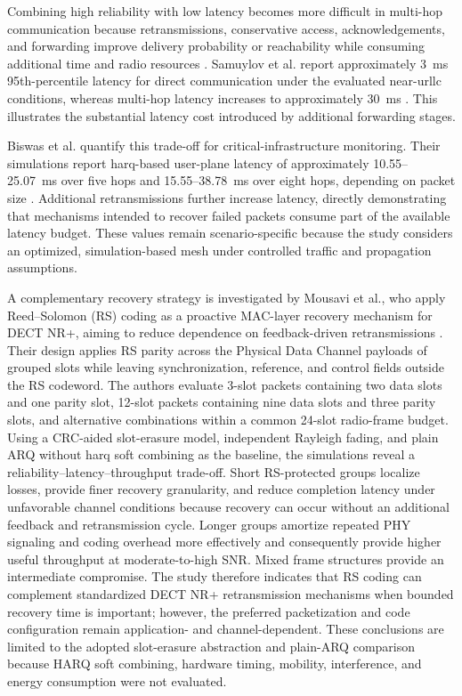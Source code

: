 Combining high reliability with low latency becomes more difficult in multi-hop communication because retransmissions, conservative access, acknowledgements, and forwarding improve delivery probability or reachability while consuming additional time and radio resources \cite{samuylovPerformanceMACLayer2024a, glazkovImprovingNearURLLCServices2025}. Samuylov et al. report approximately 3~ms 95th-percentile latency for direct communication under the evaluated near-\gls{urllc} conditions, whereas multi-hop latency increases to approximately 30~ms \cite{samuylovEmpoweringNearURLLCIoT2025}. This illustrates the substantial latency cost introduced by additional forwarding stages.

Biswas et al. quantify this trade-off for critical-infrastructure monitoring. Their simulations report \gls{harq}-based user-plane latency of approximately 10.55--25.07~ms over five hops and 15.55--38.78~ms over eight hops, depending on packet size \cite{biswasReliableLowLatencyCommunications2024}. Additional retransmissions further increase latency, directly demonstrating that mechanisms intended to recover failed packets consume part of the available latency budget. These values remain scenario-specific because the study considers an optimized, simulation-based mesh under controlled traffic and propagation assumptions.

A complementary recovery strategy is investigated by Mousavi et al., who apply Reed--Solomon (RS) coding as a proactive MAC-layer recovery mechanism for DECT NR+, aiming to reduce dependence on feedback-driven retransmissions \cite{mousaviPerformanceRS2026}. Their design applies RS parity across the Physical Data Channel payloads of grouped slots while leaving synchronization, reference, and control fields outside the RS codeword. The authors evaluate 3-slot packets containing two data slots and one parity slot, 12-slot packets containing nine data slots and three parity slots, and alternative combinations within a common 24-slot radio-frame budget. Using a CRC-aided slot-erasure model, independent Rayleigh fading, and plain ARQ without \gls{harq} soft combining as the baseline, the simulations reveal a reliability--latency--throughput trade-off. Short RS-protected groups localize losses, provide finer recovery granularity, and reduce completion latency under unfavorable channel conditions because recovery can occur without an additional feedback and retransmission cycle. Longer groups amortize repeated PHY signaling and coding overhead more effectively and consequently provide higher useful throughput at moderate-to-high SNR. Mixed frame structures provide an intermediate compromise. The study therefore indicates that RS coding can complement standardized DECT NR+ retransmission mechanisms when bounded recovery time is important; however, the preferred packetization and code configuration remain application- and channel-dependent. These conclusions are limited to the adopted slot-erasure abstraction and plain-ARQ comparison because HARQ soft combining, hardware timing, mobility, interference, and energy consumption were not evaluated.

